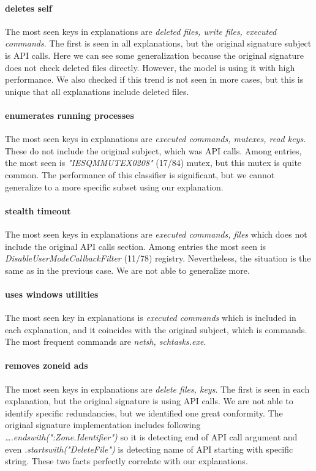 \paragraph{deletes self}
The most seen keys in explanations are \emph{deleted files, write files, executed commands}. The first is seen in all explanations, but the original signature subject is API calls. Here we can see some generalization because the original signature does not check deleted files directly. However, the model is using it with high performance. We also checked if this trend is not seen in more cases, but this is unique that all explanations include deleted files.

\paragraph{enumerates running processes}
The most seen keys in explanations are \emph{executed commands, mutexes, read keys}. These do not include the original subject, which was API calls.  Among entries, the most seen is \emph{"IESQMMUTEX0208"} (17/84) mutex, but this mutex is quite common. The performance of this classifier is significant, but we cannot generalize to a more specific subset using our explanation.

\paragraph{stealth timeout}
The most seen keys in explanations are \emph{executed commands, files} which does not include the original API calls section. Among entries the most seen is \emph{DisableUserModeCallbackFilter} (11/78) registry. Nevertheless, the situation is the same as in the previous case. We are not able to generalize more.

\paragraph{uses windows utilities}
The most seen key in explanations is \emph{executed commands} which is included in each explanation, and it coincides with the original subject, which is commands. The most frequent commands are \emph{netsh, schtasks.exe}.

\paragraph{removes zoneid ads}
The most seen keys in explanations are \emph{delete files, keys}. The first is seen in each explanation, but the original signature is using API calls. We are not able to identify specific redundancies, but we identified one great conformity. The original signature implementation includes following \emph{\dots .endswith(":Zone.Identifier")} so it is detecting end of API call argument and even \emph{.startswith("DeleteFile")} is detecting name of API starting with specific string. These two facts perfectly correlate with our explanations.

